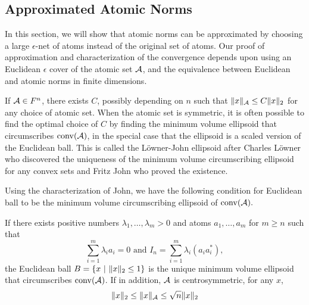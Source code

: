 

\subsection{Approximated Atomic Norms} %
\label{sub:approximated_atomic_norms}

In this section, we will show that atomic norms can be approximated by choosing
a large $\epsilon$-net of atoms instead of the original set of atoms. Our proof
of approximation and characterization of the convergence depends upon using an
Euclidean $\epsilon$ cover of the atomic set $\mathcal{A}$, and the equivalence between
Euclidean and atomic norms in finite dimensions.

If $\mathcal{A} \in F^n$, there exists $C$, possibly depending on $n$ such that
$\lVert x\rVert_{\mathcal{A}} \leq C \lVert x\rVert_2$ for any choice of atomic set. When the atomic
set is symmetric, it is often possible to find the optimal choice of $C$ by
finding the minimum volume ellipsoid that circumscribes $\operatorname{conv}(\mathcal{A})$, in the
special case that the ellipsoid is a scaled version of the Euclidean ball. This
is called the L\"{o}wner-John ellipsoid after Charles L\"{o}wner who discovered
the uniqueness of the minimum volume circumscribing ellipsoid for any convex
sets and Fritz John who proved the existence.

Using the characterization of John, we have the following condition for
Euclidean ball to be the minimum volume circumscribing ellipsoid of $\operatorname{conv}(\mathcal{A}).$

\begin{theorem}\label{thm:john:ellipsoid}
If there exists positive numbers $\lambda_1, \dots, \lambda_m >0$ and atoms
$a_1, \dots, a_m$ for $m \geq n$ such that
\[
		\sum_{i=1}^m \lambda_i a_i = 0 \text{ and } I_n = \sum_{i=1}^m \lambda_i (a_i a_i^*),
\]
the Euclidean ball $B=\left\{ x ~\middle|~ \lVert x\rVert_2 \leq 1 \right\}$ is the unique minimum
volume ellipsoid that circumscribes $\operatorname{conv}(\mathcal{A})$. If in addition, $\mathcal{A}$ is
centrosymmetric, for any $x$,
\[
	\lVert x\rVert_2 \leq \lVert x\rVert_{\mathcal{A}}  \leq \sqrt{n} \lVert x\rVert_2 
\]	
\end{theorem}


